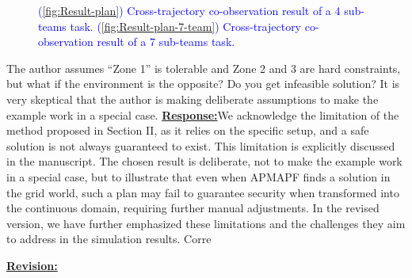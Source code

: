 \documentclass{article}
\newcommand{\re}{\tcblower \underline{\textbf{Response:}}}
\newcommand{\rv}{{\large{\underline{\textbf{Revision:}}}}\quad}
\newcommand{\new}[1]{\textcolor{blue}{#1}}
\begin{document}
  \begin{figure}[H]
	\centering
	\caption{\new{(\ref{fig:Result-plan}) Cross-trajectory co-observation result of a 4 sub-teams task. (\ref{fig:Result-plan-7-team}) Cross-trajectory co-observation result of a 7 sub-teams task.}}\label{fig:Cross-trajectory-result}
  \end{figure}
\vspace{0.2cm}

\begin{cmt}{}{}
	The author assumes “Zone 1” is tolerable and Zone 2 and 3 are hard
constraints, but what if the environment is the opposite? Do you get
infeasible solution? It is very skeptical that the author is making
deliberate assumptions to make the example work in a special case.
\re We acknowledge the limitation of the method proposed in Section II, as it relies on the specific setup, and a safe solution is not always guaranteed to exist. This limitation is explicitly discussed in the manuscript. The chosen result is deliberate, not to make the example work in a special case, but to illustrate that even when APMAPF finds a solution in the grid world, such a plan may fail to guarantee security when transformed into the continuous domain, requiring further manual adjustments. In the revised version, we have further emphasized these limitations and the challenges they aim to address in the simulation results.
Corre
\end{cmt}
\vspace{0.1cm}
\rv
\renewcommand\thesubsection{H}
\end{document}
